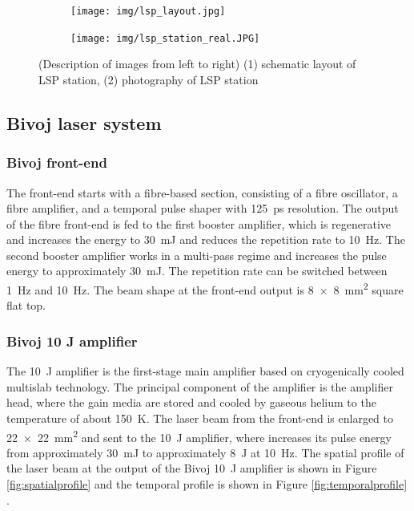 \begin{figure}[h]
\centering
\begin{subfigure}{.45\textwidth}

    \texttt{[image: img/lsp\_layout.jpg]}

    \label{fig:a}
\end{subfigure}
\begin{subfigure}{.45\textwidth}

    \texttt{[image: img/lsp\_station\_real.JPG]}

    \label{fig:b}
\end{subfigure}

\caption{(Description of images from left to right) (1) schematic layout of LSP station, (2) photography of LSP station \cite{bohm_kaufman_brajer_rostohar_2019}}
\label{fig:lsplayout}
\end{figure}



\subsection{Bivoj laser system}

\subsubsection*{Bivoj front-end}

The front-end starts with a fibre-based section, consisting
of a fibre oscillator, a fibre amplifier, and a temporal pulse shaper
with \SI{125}{\ps} resolution. The output of the fibre front-end is fed
to the first booster amplifier, which is regenerative and
increases the energy to \SI{30}{\milli\joule} and reduces the repetition rate to \SI{10}{\hertz}. The second booster amplifier works in a multi-pass regime
and increases the pulse energy to approximately \SI{30}{\milli\joule}.
The repetition rate can be switched between \SI{1}{\hertz} and \SI{10}{\hertz}. The
beam shape at the front-end output is \SI{8 x 8}{\mm\squared} square flat top.

\subsubsection*{Bivoj 10 J amplifier}

The \SI{10}{\joule}  amplifier is the first-stage main amplifier based on
cryogenically cooled multislab technology. The principal
component of the amplifier is the amplifier head, where the
gain media are stored and cooled by gaseous helium to 
the temperature of about \SI{150}{\kelvin}. The laser beam from the front-end
is enlarged to \SI{22 x 22}{\mm\squared} and sent to the \SI{10}{\joule} amplifier, where
increases its pulse energy from approximately \SI{30}{\milli\joule} to
approximately \SI{8}{\joule} at \SI{10}{\hertz}. The spatial profile of the laser beam at the output of the Bivoj \SI{10}{\joule} amplifier is shown in Figure \ref{fig:spatialprofile} and the temporal profile is shown in Figure \ref{fig:temporalprofile} \cite{saumyabrata}.

